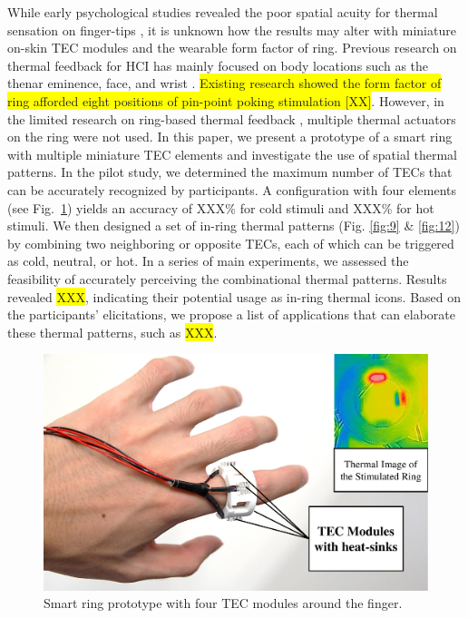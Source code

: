 \documentclass[preprint,12pt]{elsarticle}
\begin{document}
While early psychological studies revealed the poor spatial acuity for thermal sensation on finger-tips \cite{43}, it is unknown how the results may alter with miniature on-skin TEC modules and the wearable form factor of ring. Previous research on thermal feedback for HCI has mainly focused on body locations such as the thenar eminence, face, and wrist \cite{7,9,10,19,20,23,39}. \colorbox{yellow}{Existing research showed the form factor of ring afforded eight positions of pin-point poking stimulation [XX]}. However, in the limited research on ring-based thermal feedback \cite{24},  multiple thermal actuators on the ring were not used. In this paper, we present a prototype of a smart ring with multiple miniature TEC elements and investigate the use of spatial thermal patterns. In the pilot study, we determined the maximum number of TECs that can be accurately recognized by participants. A configuration with four elements (see Fig.~\ref{fig:1}) yields an accuracy of XXX\% for cold stimuli and XXX\% for hot stimuli. We then designed a set of in-ring thermal patterns (Fig. \ref{fig:9} \& \ref{fig:12}) by combining two neighboring or opposite TECs, each of which can be triggered as cold, neutral, or hot. In a series of main experiments, we assessed the feasibility of accurately perceiving the combinational thermal patterns. Results revealed \colorbox{yellow}{XXX}, indicating their potential usage as in-ring thermal icons. Based on the participants' elicitations, we propose a list of applications that can elaborate these thermal patterns, such as \colorbox{yellow}{XXX}.


\begin{figure}[tp]
  \centering
  \includegraphics[width=0.8\columnwidth]{img/fig1.pdf}
  \caption{Smart ring prototype with four TEC modules around the finger.}
  \label{fig:1}
\end{figure}
\end{document}
